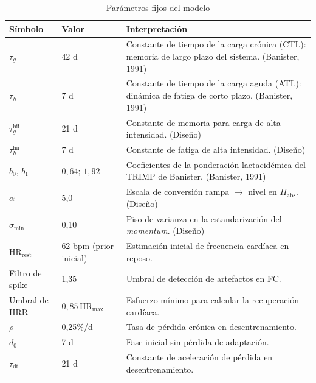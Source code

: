 \documentclass[11pt,a4paper]{article}
\begin{document}
\begin{table}[H]
\centering
\small
\caption{Parámetros fijos del modelo}
\label{tab:params}

\begin{tabularx}{\textwidth}{@{} l l X @{}}
\toprule
\textbf{Símbolo} & \textbf{Valor} & \textbf{Interpretación} \\
\midrule

$\tau_g$ & 42 d & Constante de tiempo de la carga crónica (CTL): memoria de largo plazo del sistema. (Banister, 1991) \\

$\tau_h$ & 7 d & Constante de tiempo de la carga aguda (ATL): dinámica de fatiga de corto plazo. (Banister, 1991) \\

$\tau_g^{\mathrm{hii}}$ & 21 d & Constante de memoria para carga de alta intensidad. (Diseño) \\

$\tau_h^{\mathrm{hii}}$ & 7 d & Constante de fatiga de alta intensidad. (Diseño) \\

$b_0,\,b_1$ & $0{,}64;\,1{,}92$ & Coeficientes de la ponderación lactacidémica del TRIMP de Banister. (Banister, 1991) \\

$\alpha$ & 5{,}0 & Escala de conversión rampa $\to$ nivel en $\Pi_{\mathrm{abs}}$. (Diseño) \\

$\sigma_{\min}$ & 0{,}10 & Piso de varianza en la estandarización del \emph{momentum}. (Diseño) \\

$\mathrm{HR}_{\mathrm{rest}}$ & 62 bpm (prior inicial) & Estimación inicial de frecuencia cardíaca en reposo. \\

Filtro de spike & 1{,}35 & Umbral de detección de artefactos en FC. \\

Umbral de HRR & $0{,}85\,\mathrm{HR}_{\max}$ & Esfuerzo mínimo para calcular la recuperación cardíaca. \\

$\rho$ & 0{,}25\%/d & Tasa de pérdida crónica en desentrenamiento. \\

$d_0$ & 7 d & Fase inicial sin pérdida de adaptación. \\

$\tau_{\mathrm{dt}}$ & 21 d & Constante de aceleración de pérdida en desentrenamiento. \\

\bottomrule
\end{tabularx}
\end{table}
\end{document}
